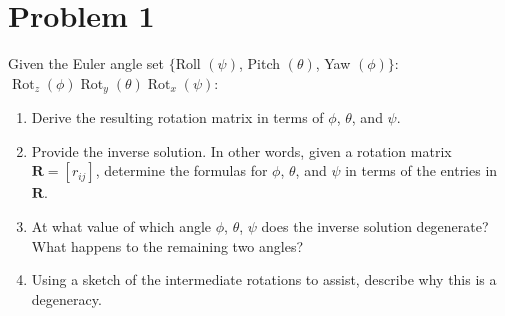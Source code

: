 \documentclass[11pt]{article}
\newcommand{\R}{\bm{R}}
\newcommand{\Rotx}{\operatorname{Rot}_x}
\newcommand{\Roty}{\operatorname{Rot}_y}
\newcommand{\Rotz}{\operatorname{Rot}_z}
\begin{document}
\section*{Problem 1}

\begin{statement}
Given the Euler angle set $\{$Roll $(\psi)$, Pitch $(\theta)$, Yaw $(\phi)\}$: $\Rotz(\phi)\Roty(\theta)\Rotx(\psi)$:
\begin{enumerate}[label=(\alph*), leftmargin=1.6em, itemsep=2pt]
    \item Derive the resulting rotation matrix in terms of $\phi$, $\theta$, and $\psi$.
    \item Provide the inverse solution. In other words, given a rotation matrix $\R = [r_{ij}]$, determine the formulas for $\phi$, $\theta$, and $\psi$ in terms of the entries in $\R$.
    \item At what value of which angle $\phi$, $\theta$, $\psi$ does the inverse solution degenerate? What happens to the remaining two angles?
    \item Using a sketch of the intermediate rotations to assist, describe why this is a degeneracy.
\end{enumerate}
\end{statement}
\end{document}
